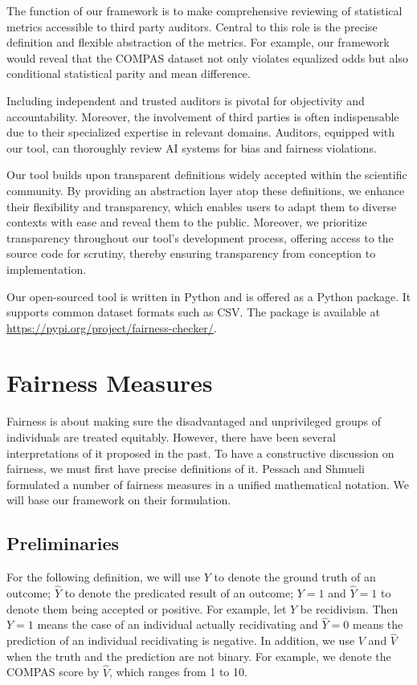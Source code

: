 \documentclass[conference]{IEEEtran}
\begin{document}
The function of our framework is to make comprehensive reviewing of statistical metrics accessible to third party auditors. Central to this role is the precise definition and flexible abstraction of the metrics. For example, our framework would reveal that the COMPAS dataset not only violates equalized odds but also conditional statistical parity and mean difference.

Including independent and trusted auditors is pivotal for objectivity and accountability. Moreover, the involvement of third parties is often indispensable due to their specialized expertise in relevant domains. Auditors, equipped with our tool, can thoroughly review AI systems for bias and fairness violations.

Our tool builds upon transparent definitions widely accepted within the scientific community. By providing an abstraction layer atop these definitions, we enhance their flexibility and transparency, which enables users to adapt them to diverse contexts with ease and reveal them to the public. Moreover, we prioritize transparency throughout our tool's development process, offering access to the source code for scrutiny, thereby ensuring transparency from conception to implementation.

Our open-sourced tool is written in Python and is offered as a Python package. It supports common dataset formats such as CSV. The package is available at \url{https://pypi.org/project/fairness-checker/}.

\section{Fairness Measures}
\label{sec:measures}
Fairness is about making sure the disadvantaged and unprivileged groups of individuals are treated equitably. However, there have been several interpretations of it proposed in the past. To have a constructive discussion on fairness, we must first have precise definitions of it. Pessach and Shmueli \cite{pessach2022review} formulated a number of fairness measures in a unified mathematical notation. We will base our framework on their formulation.

\subsection{Preliminaries}
For the following definition, we will use $Y$ to denote the ground truth of an outcome; $\hat{Y}$ to denote the predicated result of an outcome; $Y = 1$ and $\hat{Y} = 1$ to denote them being accepted or positive. For example, let $Y$ be recidivism. Then $Y = 1$ means the case of an individual actually recidivating and $\hat{Y} = 0$ means the prediction of an individual recidivating is negative. In addition, we use $V$ and $\hat{V}$ when the truth and the prediction are not binary. For example, we denote the COMPAS score by $\hat{V}$, which ranges from 1 to 10.
\end{document}

